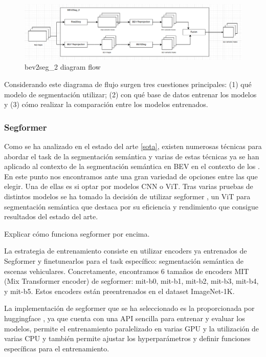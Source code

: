 \begin{figure}[h!]
    \centering
    \includegraphics[width=\linewidth]{./images/metodology/bev2seg_2_flow.png}
    \caption{bev2seg\_2 diagram flow}
    \label{fig:beg2seg_2_flow}
\end{figure}

Considerando este diagrama de flujo surgen tres cuestiones principales: (1) qué modelo de segmentación utilizar; (2) con qué base de datos entrenar los modelos y (3) cómo realizar la comparación entre los modelos entrenados.


\subsubsection{Segformer}
Como se ha analizado en el estado del arte \ref{sota}, existen numerosas técnicas para abordar el task de la segmentación semántica y varias de estas técnicas ya se han aplicado al contexto de la segmentación semántica en BEV en el contexto de los . En este punto nos encontramos ante una gran variedad de opciones entre las que elegir. Una de ellas es si optar por modelos CNN o ViT. Tras varias pruebas de distintos modelos \cite{dummy} \cite{dummy} \cite{dummy} se ha tomado la decisión de utilizar segformer \cite{segformer}, un ViT para segmentación semántica que destaca por su eficiencia y rendimiento que consigue resultados del estado del arte.

Explicar cómo funciona segformer por encima.

La estrategia de entrenamiento consiste en utilizar encoders ya entrenados de Segformer y finetunearlos para el task específico: segmentación semántica de escenas vehiculares. Concretamente, encontramos 6 tamaños de encoders MIT (Mix Transformer encoder) de segformer: mit-b0, mit-b1, mit-b2, mit-b3, mit-b4, y mit-b5. Estos encoders están preentrenados en el dataset ImageNet-1K.

La implementación de segformer que se ha seleccionado es la proporcionada por huggingface \cite{huggingface}, ya que cuenta con una API sencilla para entrenar y evaluar los modelos, permite el entrenamiento paralelizado en varias GPU y la utilización de varias CPU y también permite ajustar los hyperparámetros y definir funciones específicas para el entrenamiento.

